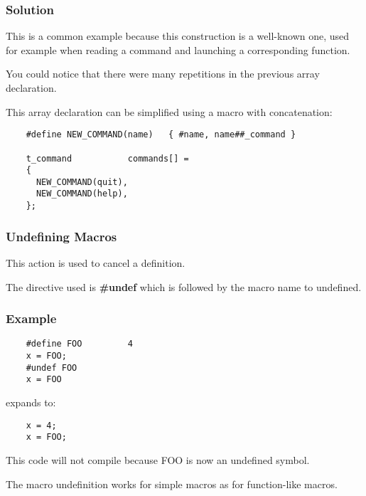 \documentclass[8pt]{beamer}
\newcommand{\nl}[0]{\vspace{0.4cm}}
\begin{document}
\begin{frame}[containsverbatim]
  \frametitle{Solution}

  This is a common example because this construction is a well-known one,
  used for example when reading a command and launching a corresponding
  function.

  \nl

  You could notice that there were many repetitions in the previous
  array declaration.

  \nl

  This array declaration can be simplified using a macro with concatenation:

  \begin{verbatim}
    #define NEW_COMMAND(name)   { #name, name##_command }

    t_command           commands[] =
    {
      NEW_COMMAND(quit),
      NEW_COMMAND(help),
    };
  \end{verbatim}
\end{frame}


\begin{frame}
  \frametitle{Undefining Macros}

  This action is used to cancel a definition.

  \nl

  The directive used is \textbf{\#undef} which is followed by the macro
  name to undefined.
\end{frame}


\begin{frame}[containsverbatim]
  \frametitle{Example}

  \begin{verbatim}
    #define FOO         4
    x = FOO;
    #undef FOO
    x = FOO
  \end{verbatim}

  expands to:

  \begin{verbatim}
    x = 4;
    x = FOO;
  \end{verbatim}

  This code will not compile because FOO is now an undefined symbol.

  \nl

  The macro undefinition works for simple macros as for function-like macros.
\end{frame}

\end{document}
